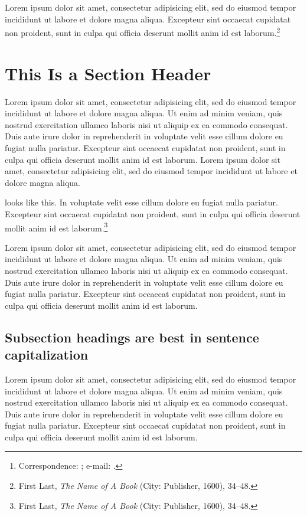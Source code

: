 \documentclass[11pt, caslon]{academic-article}
\title{\mytitle}
\date{\MakeLowercase{\mydate}}
\author{\MakeLowercase{\myauthor}\thanks{Correspondence:
	\mycorrespondence; \mbox{e-mail}: \href{mailto:\myemail}{\myemail}.}}
\begin{document}
\maketitle

Lorem ipsum dolor sit amet, consectetur adipisicing elit, sed do eiusmod
tempor incididunt ut labore et dolore magna aliqua. Excepteur sint
occaecat cupidatat non proident, sunt in culpa qui officia deserunt
mollit anim id est laborum.\footnote{First Last, \emph{The Name of A
Book} (City: Publisher, 1600), 34--48.}

\section{This Is a Section Header}

Lorem ipsum dolor sit amet, consectetur adipisicing elit, sed do eiusmod
tempor incididunt ut labore et dolore magna aliqua. Ut enim ad minim
veniam, quis nostrud exercitation ullamco laboris nisi ut aliquip ex ea
commodo consequat. Duis aute irure dolor in reprehenderit in voluptate
velit esse cillum dolore eu fugiat nulla pariatur. Excepteur sint
occaecat cupidatat non proident, sunt in culpa qui officia deserunt
mollit anim id est laborum. Lorem ipsum dolor sit amet, consectetur
adipisicing elit, sed do eiusmod tempor incididunt ut labore et dolore
magna aliqua. 

 looks like this. In voluptate velit
esse cillum dolore eu fugiat nulla pariatur. Excepteur sint occaecat
cupidatat non proident, sunt in culpa qui officia deserunt mollit anim
id est laborum.\footnote{First Last, \emph{The Name of A Book} (City:
Publisher, 1600), 34--48.}

Lorem ipsum dolor sit amet, consectetur adipisicing elit, sed do eiusmod
tempor incididunt ut labore et dolore magna aliqua. Ut enim ad minim
veniam, quis nostrud exercitation ullamco laboris nisi ut aliquip ex ea
commodo consequat. Duis aute irure dolor in reprehenderit in voluptate
velit esse cillum dolore eu fugiat nulla pariatur. Excepteur sint
occaecat cupidatat non proident, sunt in culpa qui officia deserunt
mollit anim id est laborum.

\subsection{Subsection headings are best in sentence capitalization}

Lorem ipsum dolor sit amet, consectetur adipisicing elit, sed do eiusmod
tempor incididunt ut labore et dolore magna aliqua. Ut enim ad minim
veniam, quis nostrud exercitation ullamco laboris nisi ut aliquip ex ea
commodo consequat. Duis aute irure dolor in reprehenderit in voluptate
velit esse cillum dolore eu fugiat nulla pariatur. Excepteur sint
occaecat cupidatat non proident, sunt in culpa qui officia deserunt
mollit anim id est laborum.

\end{document}

